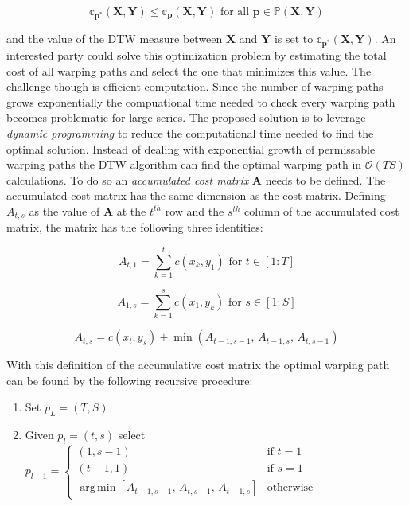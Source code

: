 \documentclass[12pt]{article}
\DeclareMathOperator*{\argmin}{arg\,min}
\begin{document}
\begin{equation}
    \mathbb{c}_{\boldsymbol{p}^{*}}(\boldsymbol{X}, \boldsymbol{Y}) \le \mathbb{c}_{\boldsymbol{p}}(\boldsymbol{X}, \boldsymbol{Y}) \,\, \textrm{for all} \,\, \boldsymbol{p} \in \mathbb{P}(\boldsymbol{X}, \boldsymbol{Y})
\end{equation}

and the value of the DTW measure between $\boldsymbol{X}$ and $\boldsymbol{Y}$ is set to $\mathbb{c}_{\boldsymbol{p^{*}}}(\boldsymbol{X}, \boldsymbol{Y})$. An interested party could solve this optimization problem by estimating the total cost of all warping paths and select the one that minimizes this value. The challenge though is efficient computation. Since the number of warping paths grows exponentially the compuational time needed to check every warping path becomes problematic for large series. The proposed solution is to leverage \emph{dynamic programming} to reduce the computational time needed to find the optimal solution. Instead of dealing with exponential growth of permissable warping paths the DTW algorithm can find the optimal warping path in $\mathcal{O}(TS)$ calculations. To do so an \emph{accumulated cost matrix} $\boldsymbol{A}$ needs to be defined. The accumulated cost matrix has the same dimension as the cost matrix. Defining $A_{t,s}$ as the value of $\boldsymbol{A}$ at the $t^{th}$ row and the $s^{th}$ column of the accumulated cost matrix, the matrix has the following three identities:

\begin{equation}
    A_{t,1} = \sum^{t}_{k=1} c(x_{k}, y_{1}) \,\, \textrm{for} \,\, t \in [1:T]
\end{equation}

\begin{equation}
    A_{1,s} = \sum^{s}_{k=1} c(x_{1}, y_{k}) \,\, \textrm{for} \,\, s \in [1:S]
\end{equation}

\begin{equation}
    A_{t, s} = c(x_{t}, y_{s}) + \min\left(A_{t-1, s-1}, \, A_{t-1, s}, \, A_{t, s-1}\right)
\end{equation}

With this definition of the accumulative cost matrix the optimal warping path can be found by the following recursive procedure:

\begin{enumerate}
    \item Set $p_{L} = (T, S)$
    \item Given $p_{l} = (t, s)$ select $p_{l - 1} = \begin{cases} (1, s-1) & \textrm{if } t=1 \\ (t-1,1) & \textrm{if } s=1 \\ 
                                            \argmin \left[ A_{t-1, s-1},\, A_{t, s-1},\, A_{t-1, s} \right] & \textrm{otherwise} \end{cases}$
\end{enumerate}
\end{document}
